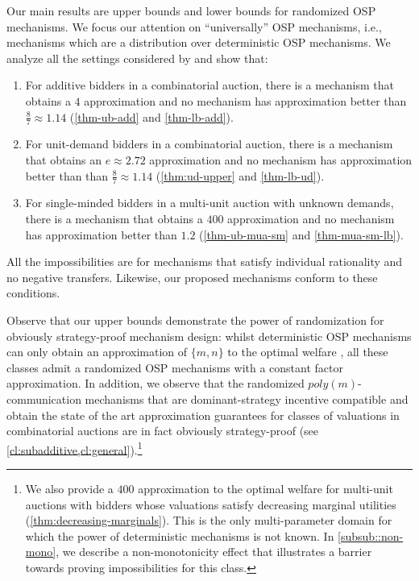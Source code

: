 Our main results are upper bounds and lower bounds for randomized OSP mechanisms.
We focus our attention on ``universally'' OSP mechanisms, i.e., mechanisms which are a distribution over deterministic OSP mechanisms.
We analyze all the settings considered by 
 \cite{Ron24} and  show that:
\begin{enumerate}
    \item For additive bidders in a combinatorial auction, there is a mechanism that obtains a $4$ approximation and
    no mechanism has approximation better than $\frac{8}{7}\approx 1.14$  (\cref{thm-ub-add} and \cref{thm-lb-add}).
\item For unit-demand bidders in a combinatorial auction, 
there is a mechanism
    that obtains an $e\approx 2.72$ approximation and
no mechanism has approximation better than
than $\frac{8}{7}\approx 1.14$ (\cref{thm:ud-upper} and \cref{thm-lb-ud}). 
    \item For single-minded bidders in a multi-unit auction with unknown demands, 
    there is a mechanism that obtains a $400$ approximation and no mechanism has approximation better than $1.2$ (\cref{thm-ub-mua-sm} and \cref{thm-mua-sm-lb}). 
\end{enumerate}
All the impossibilities %
are for mechanisms that satisfy individual rationality and no negative transfers. Likewise,
our proposed mechanisms
conform to these conditions. 


Observe that our upper bounds demonstrate the power of randomization for obviously strategy-proof mechanism design:
whilst deterministic OSP mechanisms 
can only obtain an approximation of 
$\{m,n\}$ to the optimal welfare \cite{Ron24}, 
all these classes admit a randomized OSP mechanisms with a  constant factor approximation. 
In addition, we observe that the randomized $poly(m)$-communication mechanisms that are
dominant-strategy incentive compatible and obtain the state of the art approximation guarantees for  classes of valuations in combinatorial auctions are in fact  obviously strategy-proof (see \cref{cl:subadditive,cl:general}).\footnote{We also provide a $400$ approximation to the optimal welfare for
multi-unit auctions with bidders whose valuations satisfy decreasing marginal utilities (\cref{thm:decreasing-marginals}). This is the only multi-parameter domain for which the power of deterministic mechanisms is not known. In \cref{subsub::non-mono}, 
we describe a non-monotonicity effect that illustrates a barrier towards proving impossibilities for this class.}


